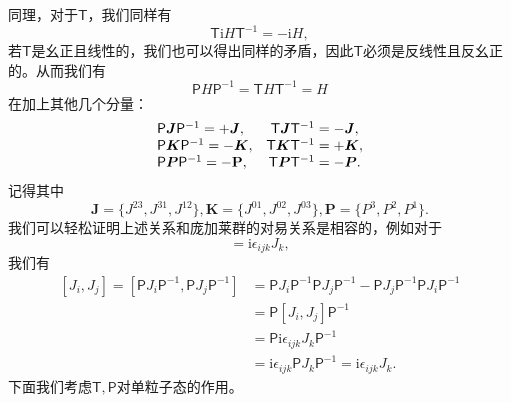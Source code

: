 同理，对于$\mathsf{T}$，我们同样有
\begin{equation*}
	\mathsf{T}\mathrm{i} H\mathsf{T}^{-1} =-\mathrm{i} H,
\end{equation*}
若$\mathsf{T}$是幺正且线性的，我们也可以得出同样的矛盾，因此$\mathsf{T}$必须是反线性且反幺正的。从而我们有
\begin{equation*}
	\mathsf{P} H\mathsf{P}^{-1} =\mathsf{T} H\mathsf{T}^{-1} =H
\end{equation*}
在加上其他几个分量：
\begin{equation*}
	\begin{array}{ l c }
		\mathsf{P}\boldsymbol{J}\mathsf{P}^{-1} =+\boldsymbol{J} , & \mathsf{T}\boldsymbol{J}\mathsf{T}^{-1} =-\boldsymbol{J} ,\\
		\mathsf{P}\boldsymbol{K}\mathsf{P}^{-1} =-\boldsymbol{K} , & \mathsf{T}\boldsymbol{K}\mathsf{T}^{-1} =+\boldsymbol{K} ,\\
		\mathsf{P}\boldsymbol{P}\mathsf{P}^{-1} =-\mathbf{P} , & \mathsf{T}\boldsymbol{P}\mathsf{T}^{-1} =-\boldsymbol{P} .
	\end{array}
\end{equation*}
记得其中
\begin{equation*}
	\boldsymbol{J} =\{J^{23} ,J^{31} ,J^{12} \},\boldsymbol{K} =\{J^{01} ,J^{02} ,J^{03} \},\boldsymbol{P} =\{P^{3} ,P^{2} ,P^{1} \}.
\end{equation*}
我们可以轻松证明上述关系和庞加莱群的对易关系是相容的，例如对于
\begin{equation*}
	[ J_{i} ,J_{j}] =\mathrm{i} \epsilon _{ijk} J_{k} ,
\end{equation*}
我们有
\begin{equation*}
	\begin{aligned}
		[ J_{i} ,J_{j}] =[\mathsf{P} J_{i}\mathsf{P}^{-1} ,\mathsf{P} J_{j}\mathsf{P}^{-1} ] & =\mathsf{P} J_{i}\mathsf{P}^{-1}\mathsf{P} J_{j}\mathsf{P}^{-1} -\mathsf{P} J_{j}\mathsf{P}^{-1}\mathsf{P} J_{i}\mathsf{P}^{-1}\\
		& =\mathsf{P} [J_{i} ,J_{j} ]\mathsf{P}^{-1}\\
		& =\mathsf{P}\mathrm{i} \epsilon _{ijk} J_{k}\mathsf{P}^{-1}\\
		& =\mathrm{i} \epsilon _{ijk}\mathsf{P} J_{k}\mathsf{P}^{-1} =\mathrm{i} \epsilon _{ijk} J_{k} .
	\end{aligned}
\end{equation*}
下面我们考虑$\mathsf{T} ,\mathsf{P}$对单粒子态的作用。


